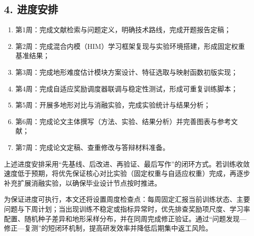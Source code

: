\documentclass[12pt,a4paper]{ctexart}
\begin{document}
\subsection*{4. 进度安排}
\begin{enumerate}
  \item 第1周：完成文献检索与问题定义，明确技术路线，完成开题报告定稿；
  \item 第2周：完成混合内模（HIM）学习框架复现与实验环境搭建，形成固定权重基准结果；
  \item 第3周：完成地形难度估计模块方案设计、特征选取与映射函数初版实现；
  \item 第4周：完成自适应奖励调度器联调与稳定性测试，形成可重复训练脚本；
  \item 第5周：开展多地形对比与消融实验，完成实验统计与结果分析；
  \item 第6周：完成论文主体撰写（方法、实验、结果分析）并完善图表与参考文献；
  \item 第7周：完成论文定稿、查重修改与答辩材料准备。
\end{enumerate}

上述进度安排采用“先基线、后改进、再验证、最后写作”的闭环方式。若训练收敛速度低于预期，将优先保证核心对比实验（固定权重与自适应权重）完成，再逐步补充扩展消融实验，以确保毕业设计节点按时推进。

为保证进度可执行，本文还将设置周度检查点：每周固定汇报当前训练状态、主要问题与下周计划；当出现训练不稳定或指标异常时，优先排查奖励项尺度、学习率配置、随机种子差异和地形采样分布，并在同周完成修正验证。通过“问题发现—修正—复测”的短闭环机制，提高研发效率并降低后期集中返工风险。
\end{document}
